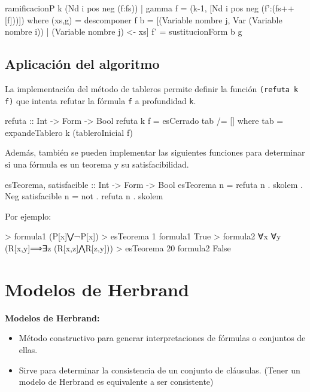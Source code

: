 \documentclass{beamer}
\begin{document}
\begin{frame}[fragile]
  \begin{code}
ramificacionP k (Nd i pos neg (f:fs))
    | gamma    f = (k-1, [Nd i pos neg (f':(fs++[f]))])
    where 
      (xs,g) = descomponer f
      b      = [(Variable nombre j, Var (Variable nombre i))
               | (Variable nombre j) <- xs]
      f'     = sustitucionForm b g
  \end{code}
\end{frame}

\subsection{Aplicación del algoritmo}

\begin{frame}[fragile]
  La implementación del método de tableros permite definir la función \texttt{(refuta k f)}
  que intenta refutar la fórmula \texttt{f} a profundidad \texttt{k}.
  \begin{code}
refuta :: Int -> Form -> Bool
refuta k f = esCerrado tab /= []
    where tab = expandeTablero k (tableroInicial f)  
  \end{code}
  Además, también se pueden implementar las siguientes funciones para determinar si una fórmula
  es un teorema y su satisfacibilidad. 
  \begin{code}
esTeorema, satisfacible :: Int -> Form -> Bool
esTeorema n = refuta n . skolem . Neg
satisfacible n = not . refuta n . skolem
\end{code}
\end{frame}

\begin{frame}[fragile]
  Por ejemplo:

\begin{code}  
> formula1
(P[x]⋁¬P[x])
> esTeorema 1 formula1
True
> formula2
∀x ∀y (R[x,y]⟹∃z (R[x,z]⋀R[z,y]))
> esTeorema 20 formula2
False
\end{code}  
\end{frame}
\section{Modelos de Herbrand}

\begin{frame}
  \textbf{Modelos de Herbrand:}
  \begin{itemize}
  \item Método constructivo para generar interpretaciones de fórmulas o conjuntos de ellas.
  \item Sirve para determinar la consistencia de un conjunto de cláusulas. (Tener un modelo de
    Herbrand es equivalente a ser consistente)
  \end{itemize}
\end{frame}
\end{document}
